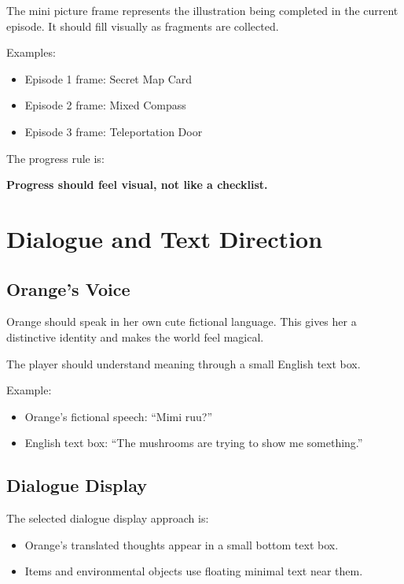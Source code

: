 \documentclass[12pt]{article}
\begin{document}
The mini picture frame represents the illustration being completed in the current episode. It should fill visually as fragments are collected.

Examples:

\begin{itemize}[leftmargin=*]
    \item Episode 1 frame: Secret Map Card
    \item Episode 2 frame: Mixed Compass
    \item Episode 3 frame: Teleportation Door
\end{itemize}

The progress rule is:

\begin{center}
\textbf{Progress should feel visual, not like a checklist.}
\end{center}

\section{Dialogue and Text Direction}

\subsection{Orange's Voice}

Orange should speak in her own cute fictional language. This gives her a distinctive identity and makes the world feel magical.

The player should understand meaning through a small English text box.

Example:

\begin{itemize}[leftmargin=*]
    \item Orange's fictional speech: ``Mimi ruu?''
    \item English text box: ``The mushrooms are trying to show me something.''
\end{itemize}

\subsection{Dialogue Display}

The selected dialogue display approach is:

\begin{itemize}[leftmargin=*]
    \item Orange's translated thoughts appear in a small bottom text box.
    \item Items and environmental objects use floating minimal text near them.
\end{itemize}
\end{document}
